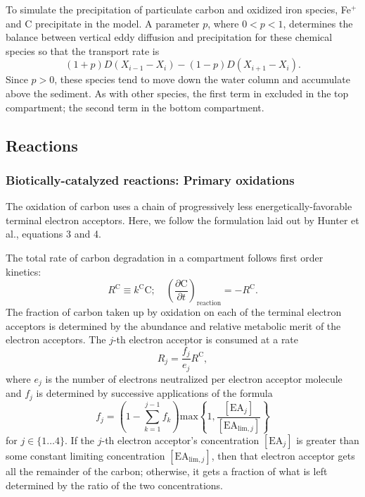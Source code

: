\documentclass{report}
\newcommand{\m}[1]{ \mathrm{#1} }
\begin{document}
To simulate the precipitation of particulate carbon and oxidized iron species, Fe$^+$ and C precipitate in the model. A parameter $p$, where $0 < p < 1$,
determines the balance between vertical eddy diffusion and precipitation for these chemical species so that
the transport rate is
\begin{equation}
  (1 + p) D \left(X_{i-1} - X_i\right) - (1-p) D \left(X_{i+1} - X_i\right).
\end{equation}
Since $p > 0$, these species tend to move down the water column and accumulate above the sediment. As with other species, the first
term in excluded in the top compartment; the second term in the bottom compartment.

\subsection{Reactions}
\subsubsection{Biotically-catalyzed reactions: Primary oxidations}
The oxidation of carbon uses a chain of progressively less energetically-favorable terminal
electron acceptors. Here, we follow the formulation laid out by Hunter et
al.\cite{hunterkinetic1998}, equations 3 and 4.

The total rate of carbon degradation in a compartment follows first order kinetics:
\begin{equation}
  R^\m{C} \equiv k^\m{C} \m{C}; \quad \left( \frac{\partial \m{C}}{\partial t}
  \right)_\text{reaction} = -R^\m{C}.
\end{equation}
The fraction of carbon taken up by oxidation on each of the terminal electron acceptors is
determined by the abundance and relative metabolic merit of the electron acceptors. The $j$-th electron acceptor is
consumed at a rate
\begin{equation}
  R_j = \frac{f_j}{e_j} R^\m{C},
\end{equation}
where $e_j$ is the number of electrons neutralized per electron acceptor molecule and $f_j$
is determined by successive applications of the formula
\begin{equation}
  f_j = \left( 1 - \sum_{k=1}^{j-1} f_k \right) \mathrm{max} \left\{ 1,
  \frac{[\mathrm{EA}_j]}{[\mathrm{EA}_{\mathrm{lim},j}]} \right \}
\end{equation}
for $j \in \{ 1 \ldots 4 \}$. If the $j$-th electron acceptor's concentration $[\mathrm{EA}_j]$ is greater than some constant
limiting concentration $[\mathrm{EA}_{\mathrm{lim},j}]$, then that electron acceptor gets
all the remainder of the carbon; otherwise, it gets a fraction of what is left determined by
the ratio of the two concentrations.
\end{document}
